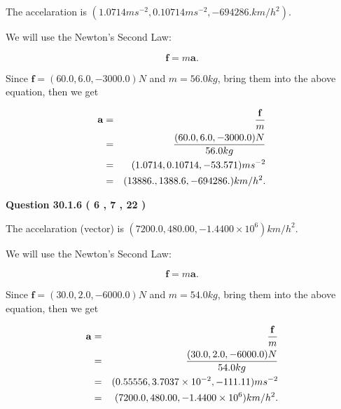 \documentclass[12pt]{article}
\begin{document}
 
\noindent{}
 
 
The accelaration is
$(
1.0714ms^{-2},
0.10714ms^{-2},
-694286.km/h^2
).
$
 
 
 
 
 
 
\noindent{}

We will use the Newton's Second Law:
 
\[
\mathbf{f}=m\mathbf{a}.
\]
 
Since $\mathbf{f}=( %
60.0,  %
6.0,  %
-3000.0 )N$
and $m= %
56.0kg$, bring them into the above equation, then we get
 
\begin{eqnarray*}
\mathbf{a}&=&\frac{\mathbf{f}}m  \\
&=&\frac{(
60.0 ,
6.0 ,
-3000.0 )N
}{ %
56.0 kg}  \\
&=&(
1.0714 ,
0.10714,
-53.571
)ms^{-2} \\
&=&(
13886. ,
1388.6 ,
-694286.
)km/h^2.
\end{eqnarray*}
 
 
 
  
\vspace{0.2in}
  
{\textbf{\Large{Question
30.1.6 
 (           6 ,           7 ,          22 )
}}}
  
  
 
 
\noindent{}
 
 
The accelaration (vector) is
$(
7200.0,
480.00 ,
-1.4400 \times 10^{6}
)km/h^2.
$
 
 
 
 
 
 
\noindent{}

We will use the Newton's Second Law:
 
\[
\mathbf{f}=m\mathbf{a}.
\]
 
Since $\mathbf{f}=( %
30.0,  %
2.0,  %
-6000.0 )N$
and $m= %
54.0 kg$, bring them into the above equation, then we get
 
\begin{eqnarray*}
\mathbf{a}&=&\frac{\mathbf{f}}m  \\
&=&\frac{(
30.0 ,
2.0 ,
-6000.0 )N
}{ %
54.0 kg}  \\
&=&(
0.55556 ,
3.7037 \times 10^{-2},
-111.11
)ms^{-2} \\
&=&(
7200.0 ,
480.00 ,
-1.4400 \times 10^{6}
)km/h^2.
\end{eqnarray*}
 
\end{document}

